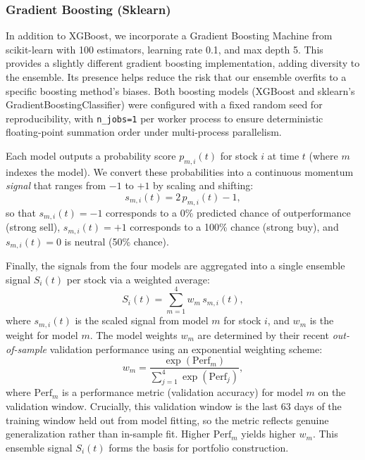 \documentclass[conference]{IEEEtran}
\begin{document}
\subsubsection{Gradient Boosting (Sklearn)}
In addition to XGBoost, we incorporate a Gradient Boosting Machine from scikit-learn with 100 estimators, learning rate 0.1, and max depth 5. This provides a slightly different gradient boosting implementation, adding diversity to the ensemble. Its presence helps reduce the risk that our ensemble overfits to a specific boosting method's biases. Both boosting models (XGBoost and sklearn's GradientBoostingClassifier) were configured with a fixed random seed for reproducibility, with \texttt{n\_jobs=1} per worker process to ensure deterministic floating-point summation order under multi-process parallelism.

Each model outputs a probability score $p_{m,i}(t)$ for stock $i$ at time $t$ (where $m$ indexes the model). We convert these probabilities into a continuous momentum \emph{signal} that ranges from $-1$ to $+1$ by scaling and shifting:
\begin{equation}
s_{m,i}(t) = 2\,p_{m,i}(t) - 1,
\end{equation}
so that $s_{m,i}(t)=-1$ corresponds to a 0\% predicted chance of outperformance (strong sell), $s_{m,i}(t)=+1$ corresponds to a 100\% chance (strong buy), and $s_{m,i}(t)=0$ is neutral (50\% chance).

Finally, the signals from the four models are aggregated into a single ensemble signal $S_i(t)$ per stock via a weighted average:
\begin{equation}
S_i(t) = \sum_{m=1}^{4} w_m \, s_{m,i}(t),
\end{equation}
where $s_{m,i}(t)$ is the scaled signal from model $m$ for stock $i$, and $w_m$ is the weight for model $m$. The model weights $w_m$ are determined by their recent \emph{out-of-sample} validation performance using an exponential weighting scheme:
\begin{equation}
w_m = \frac{\exp(\mathrm{Perf}_m)}{\sum_{j=1}^{4} \exp(\mathrm{Perf}_j)},
\end{equation}
where $\mathrm{Perf}_m$ is a performance metric (validation accuracy) for model $m$ on the validation window. Crucially, this validation window is the last 63 days of the training window held out from model fitting, so the metric reflects genuine generalization rather than in-sample fit. Higher $\mathrm{Perf}_m$ yields higher $w_m$. This ensemble signal $S_i(t)$ forms the basis for portfolio construction.
\end{document}
